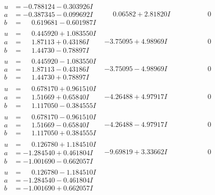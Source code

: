 \documentclass[1p]{elsarticle_modified}
\theoremstyle{definition}
\begin{document}
$$\begin{array}{c|c|c}
\begin{aligned}
u &= -0.788124 - 0.303926 I \\
a &= -0.387345 - 0.099692 I \\
b &= \phantom{-}0.619681 - 0.601987 I\end{aligned}
 & \phantom{-}0.06582 + 2.81820 I & \phantom{-0.000000 } 0 \\ \hline\begin{aligned}
u &= \phantom{-}0.445920 + 1.083550 I \\
a &= \phantom{-}1.87113 + 0.43186 I \\
b &= \phantom{-}1.44730 - 0.78897 I\end{aligned}
 & -3.75095 + 4.98969 I & \phantom{-0.000000 } 0 \\ \hline\begin{aligned}
u &= \phantom{-}0.445920 - 1.083550 I \\
a &= \phantom{-}1.87113 - 0.43186 I \\
b &= \phantom{-}1.44730 + 0.78897 I\end{aligned}
 & -3.75095 - 4.98969 I & \phantom{-0.000000 } 0 \\ \hline\begin{aligned}
u &= \phantom{-}0.678170 + 0.961510 I \\
a &= \phantom{-}1.51669 + 0.65840 I \\
b &= \phantom{-}1.117050 - 0.384555 I\end{aligned}
 & -4.26488 + 4.97917 I & \phantom{-0.000000 } 0 \\ \hline\begin{aligned}
u &= \phantom{-}0.678170 - 0.961510 I \\
a &= \phantom{-}1.51669 - 0.65840 I \\
b &= \phantom{-}1.117050 + 0.384555 I\end{aligned}
 & -4.26488 - 4.97917 I & \phantom{-0.000000 } 0 \\ \hline\begin{aligned}
u &= \phantom{-}0.126780 + 1.184510 I \\
a &= -1.284540 + 0.461804 I \\
b &= -1.001690 - 0.662057 I\end{aligned}
 & -9.69819 + 3.33662 I & \phantom{-0.000000 } 0 \\ \hline\begin{aligned}
u &= \phantom{-}0.126780 - 1.184510 I \\
a &= -1.284540 - 0.461804 I \\
b &= -1.001690 + 0.662057 I\end{aligned}

\end{array}$$
\end{document}
